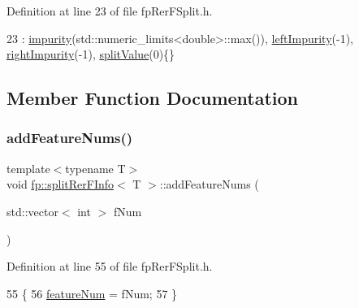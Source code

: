 Definition at line 23 of file fp\+Rer\+F\+Split.\+h.


\begin{DoxyCode}
23 : \hyperlink{classfp_1_1splitRerFInfo_a37516896816870be54ff20a713dc4bd3}{impurity}(std::numeric\_limits<double>::max()), \hyperlink{classfp_1_1splitRerFInfo_a22a358c2d6a8105bf1af86ed2823d1d1}{leftImpurity}(-1), 
      \hyperlink{classfp_1_1splitRerFInfo_ae9c05e45d6da53a663393e4ff2a01c41}{rightImpurity}(-1), \hyperlink{classfp_1_1splitRerFInfo_a9bdbbaacd0da790fa938a0f5176890bc}{splitValue}(0)\{\}
\end{DoxyCode}


\subsection{Member Function Documentation}
\mbox{\label{classfp_1_1splitRerFInfo_a2494bbdac133a9e3276a2d7ed7ac909e}} 
\subsubsection{\texorpdfstring{add\+Feature\+Nums()}{addFeatureNums()}}
{\footnotesize\ttfamily template$<$typename T$>$ \\
void \hyperlink{classfp_1_1splitRerFInfo}{fp\+::split\+Rer\+F\+Info}$<$ T $>$\+::add\+Feature\+Nums (\begin{DoxyParamCaption}\item[{std\+::vector$<$ int $>$}]{f\+Num }\end{DoxyParamCaption})\hspace{0.3cm}{\ttfamily [inline]}}



Definition at line 55 of file fp\+Rer\+F\+Split.\+h.


\begin{DoxyCode}
55                                                                \{
56                     \hyperlink{classfp_1_1splitRerFInfo_aad977b73aea39d978ae0f04c3d8bf6ef}{featureNum} = fNum;
57                 \}
\end{DoxyCode}
\mbox{\label{classfp_1_1splitRerFInfo_a469fc628f56cab1f2fa6f28476ddec55}} 
